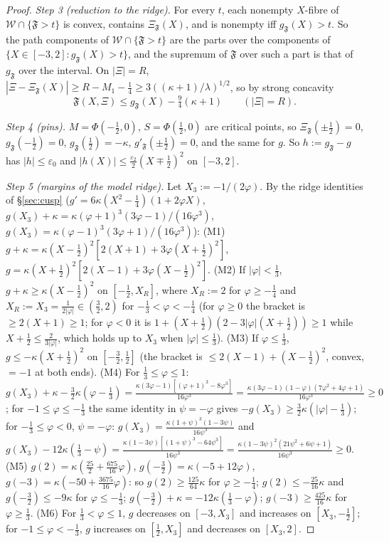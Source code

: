 \begin{proof}
\emph{Step 3 (reduction to the ridge).} For every $t$, each nonempty $X$-fibre of $\mathcal W\cap\{\mathfrak F>t\}$ is convex, contains $\Xi_{\mathfrak F}(X)$, and is nonempty iff $g_{\mathfrak F}(X)>t$. So the path components of $\mathcal W\cap\{\mathfrak F>t\}$ are the parts over the components of $\{X\in[-3,2]:g_{\mathfrak F}(X)>t\}$, and the supremum of $\mathfrak F$ over such a part is that of $g_{\mathfrak F}$ over the interval. On $|\Xi|=R$, $|\Xi-\Xi_{\mathfrak F}(X)|\ge R-M_1-\frac14\ge3((\kappa+1)/\lambda)^{1/2}$, so by strong concavity
\begin{equation}\label{eq:third-trans}
\mathfrak F(X,\Xi)\le g_{\mathfrak F}(X)-\tfrac94(\kappa+1)\qquad(|\Xi|=R).
\end{equation}

\emph{Step 4 (pins).} $M=\Phi(-\frac12,0)$, $S=\Phi(\frac12,0)$ are critical points, so $\Xi_{\mathfrak F}(\pm\frac12)=0$, $g_{\mathfrak F}(-\frac12)=0$, $g_{\mathfrak F}(\frac12)=-\kappa$, $g'_{\mathfrak F}(\pm\frac12)=0$, and the same for $g$. So $h:=g_{\mathfrak F}-g$ has $|h|\le\varepsilon_0$ and $|h(X)|\le\frac{\varepsilon_2}2(X\mp\frac12)^2$ on $[-3,2]$.

\emph{Step 5 (margins of the model ridge).} Let $X_3:=-1/(2\varphi)$. By the ridge identities of \S\ref{sec:cusp} ($g'=6\kappa(X^2-\frac14)(1+2\varphi X)$, $g(X_3)+\kappa=\kappa(\varphi+1)^3(3\varphi-1)/(16\varphi^3)$, $g(X_3)=\kappa(\varphi-1)^3(3\varphi+1)/(16\varphi^3)$):
(M1) $g+\kappa=\kappa(X-\frac12)^2[2(X+1)+3\varphi(X+\frac12)^2]$, $g=\kappa(X+\frac12)^2[2(X-1)+3\varphi(X-\frac12)^2]$.
(M2) If $|\varphi|<\frac13$, $g+\kappa\ge\kappa(X-\frac12)^2$ on $[-\frac12,X_R]$, where $X_R:=2$ for $\varphi\ge-\frac14$ and $X_R:=X_3=\frac1{2|\varphi|}\in(\frac32,2)$ for $-\frac13<\varphi<-\frac14$ (for $\varphi\ge0$ the bracket is $\ge2(X+1)\ge1$; for $\varphi<0$ it is $1+(X+\frac12)(2-3|\varphi|(X+\frac12))\ge1$ while $X+\frac12\le\frac2{3|\varphi|}$, which holds up to $X_3$ when $|\varphi|\le\frac13$).
(M3) If $\varphi\le\frac13$, $g\le-\kappa(X+\frac12)^2$ on $[-\frac32,\frac12]$ (the bracket is $\le2(X-1)+(X-\frac12)^2$, convex, $=-1$ at both ends).
(M4) For $\frac13\le\varphi\le1$: $g(X_3)+\kappa-\frac32\kappa(\varphi-\frac13)=\frac{\kappa(3\varphi-1)[(\varphi+1)^3-8\varphi^3]}{16\varphi^3}=\frac{\kappa(3\varphi-1)(1-\varphi)(7\varphi^2+4\varphi+1)}{16\varphi^3}\ge0$; for $-1\le\varphi\le-\frac13$ the same identity in $\psi=-\varphi$ gives $-g(X_3)\ge\frac32\kappa(|\varphi|-\frac13)$; for $-\frac13\le\varphi<0$, $\psi=-\varphi$: $g(X_3)=\frac{\kappa(1+\psi)^3(1-3\psi)}{16\psi^3}$ and $g(X_3)-12\kappa(\frac13-\psi)=\frac{\kappa(1-3\psi)[(1+\psi)^3-64\psi^3]}{16\psi^3}=\frac{\kappa(1-3\psi)^2(21\psi^2+6\psi+1)}{16\psi^3}\ge0$.
(M5) $g(2)=\kappa(\frac{25}2+\frac{675}{16}\varphi)$, $g(-\frac32)=\kappa(-5+12\varphi)$, $g(-3)=\kappa(-50+\frac{3675}{16}\varphi)$: so $g(2)\ge\frac{125}{64}\kappa$ for $\varphi\ge-\frac14$; $g(2)\le-\frac{25}{16}\kappa$ and $g(-\frac32)\le-9\kappa$ for $\varphi\le-\frac13$; $g(-\frac32)+\kappa=-12\kappa(\frac13-\varphi)$; $g(-3)\ge\frac{425}{16}\kappa$ for $\varphi\ge\frac13$.
(M6) For $\frac13<\varphi\le1$, $g$ decreases on $[-3,X_3]$ and increases on $[X_3,-\frac12]$; for $-1\le\varphi<-\frac13$, $g$ increases on $[\frac12,X_3]$ and decreases on $[X_3,2]$.


\end{proof}
